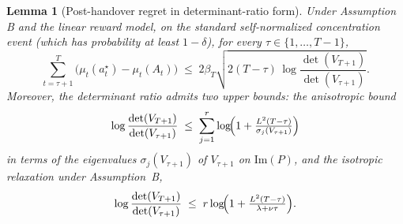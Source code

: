 \documentclass{article}
\newtheorem{lemma}{Lemma}
\theoremstyle{definition}
\theoremstyle{remark}
\theoremstyle{remark}
\begin{document}
\begin{lemma}[Post-handover regret in determinant-ratio form]
\label{lem:post-handover}
Under Assumption B and the linear reward model, on the standard
self-normalized concentration event (which has probability at least
$1-\delta$), for every $\tau\in\{1,\dots,T-1\}$,
\begin{equation}
\label{eq:post-handover-det}
\sum_{t=\tau+1}^{T}\bigl(\mu_t(a_t^\star)-\mu_t(A_t)\bigr)
\;\le\;
2\beta_T
\sqrt{
2(T-\tau)\,\log\dfrac{\det(V_{T+1})}{\det(V_{\tau+1})}
}.
\end{equation}
Moreover, the determinant ratio admits two upper bounds: the
\emph{anisotropic} bound
\begin{equation}
\label{eq:det-anisotropic}
\log\dfrac{\det(V_{T+1})}{\det(V_{\tau+1})}
\;\le\;
\sum_{j=1}^{r}
\log\!\Bigl(
1+\tfrac{L^2(T-\tau)}{\sigma_j(V_{\tau+1})}
\Bigr)
\end{equation}
in terms of the eigenvalues $\sigma_j(V_{\tau+1})$ of $V_{\tau+1}$ on
$\mathrm{Im}(P)$, and the \emph{isotropic} relaxation under Assumption~B,
\begin{equation}
\label{eq:det-isotropic}
\log\dfrac{\det(V_{T+1})}{\det(V_{\tau+1})}
\;\le\;
r\log\!\Bigl(
1+\tfrac{L^2(T-\tau)}{\lambda+\nu\tau}
\Bigr).
\end{equation}
\end{lemma}
\end{document}
